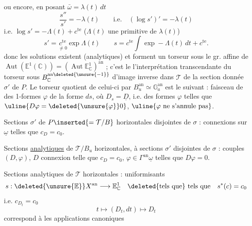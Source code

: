 ou encore, en posant $\bar\omega=\lambda(t)\,dt$
\[
\frac{s''}{s'}=-\lambda(t)\qquad\text{i.e.}\quad(\log s')'=-\lambda(t)
\]
i.e. $\log s'=-\Lambda(t)+c^{\mathrm{te}}$ ($\Lambda(t)$ une primitive de $\lambda(t)$)
\[
s'=\underset{\ne0}{c^{\mathrm{te}}}\exp\Lambda(t)\qquad
s=c^{\mathrm{te}}\int\exp-\Lambda(t)\,dt+c^{\mathrm{te}}.
\]
donc les solutions existent (analytiques) et  forment un torseur  sous le gr. affine de $\operatorname{Aut}(\mathbb E^1(\mathbb C))=(\operatorname{Aut}\mathbb E^1_{\mathbb C})^{\mathrm{an}}$ ; c'est le  l'interprétation transcendante du torseur \deleted{$\unsure{\longrightarrow}$} sous $B_{\mathbb C}^{\mathrm{an}\deleted{\unsure{-1}}}$  d'image inverse dans $\mathcal T$ de la section donnée $\sigma'$ de $P$. Le torseur quotient de celui-ci par $B_u^{\mathrm{an}}\simeq\mathbb G_a^{\mathrm{an}}$ est le suivant :
 faisceau de  des 1-formes $\varphi$ de la forme $ds$, où $D_s=\underline D$, i.e. des formes $\varphi$ telles que $\uline{D\varphi=\deleted{\unsure{\varphi}}0}$, $\uline{\varphi\text{ ne s'annule pas}}$.

 Sections $\sigma'$  de $P\inserted{=\mathcal T/B}$ horizontales disjointes de $\sigma$ : connexions sur $\underline\omega$ telles que $c_D=c_0$.

Sections \uline{analytiques} de $\mathcal T/B_u$ horizontales,  à sections $\sigma'$ disjointes de $\sigma$ : couples  $(D,\varphi)$, $D$ connexion  telle que $c_D=c_0$, $\varphi\in\Gamma^{\mathrm{an}}\underline\omega$ telles que $D\varphi=0$.

Sections analytiques de $\mathcal T$ horizontales  : uniformisants
\[
s:\deleted{\unsure{\mathbb E}}X^{\mathrm{an}}\longrightarrow\mathbb E^1_{\mathbb C}
\quad\text{\deleted{tels que} tels que}\quad s^*(c)=c_0
\]
i.e. $c_{D_t}=c_0$
\[
t\longmapsto(D_t,dt)\longmapsto D_t
\]
correspond à les applications canoniques
